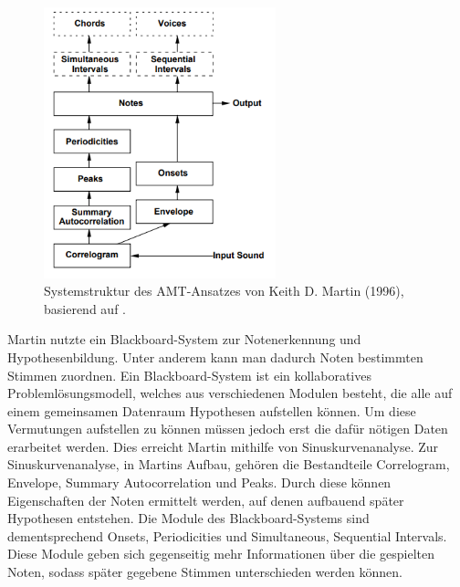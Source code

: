 \begin{figure}[H]
    \centering
    \includegraphics[width=0.6\textwidth]{Graphics/Martin1996Structure}
    \caption{Systemstruktur des AMT-Ansatzes von Keith D. Martin (1996), basierend auf \cite{Martin1996}.}
    \label{fig:martin-structure}
\end{figure}

Martin nutzte ein Blackboard-System zur Notenerkennung und Hypothesenbildung.
Unter anderem kann man dadurch Noten bestimmten Stimmen zuordnen.
Ein Blackboard-System ist ein kollaboratives Problemlösungsmodell, welches aus verschiedenen Modulen besteht,
die alle auf einem gemeinsamen Datenraum Hypothesen aufstellen können.
Um diese Vermutungen aufstellen zu können müssen jedoch erst die dafür nötigen Daten erarbeitet werden.
Dies erreicht Martin mithilfe von Sinuskurvenanalyse.
Zur Sinuskurvenanalyse, in Martins Aufbau, gehören die Bestandteile
Correlogram, Envelope, Summary Autocorrelation und Peaks.
Durch diese können Eigenschaften der Noten ermittelt werden, auf denen aufbauend später Hypothesen entstehen.
Die Module des Blackboard-Systems sind dementsprechend
Onsets, Periodicities und Simultaneous, Sequential Intervals.
Diese Module geben sich gegenseitig mehr Informationen über die gespielten Noten,
sodass später gegebene Stimmen unterschieden werden können.

